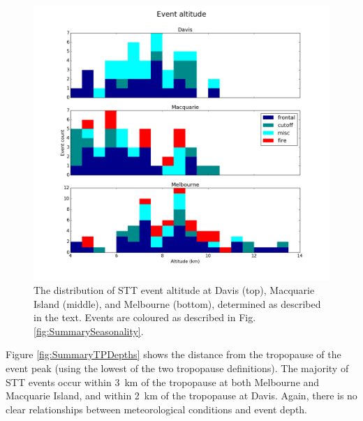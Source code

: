 \documentclass{article}
\begin{document}
  \begin{figure}[!htbp]
    \begin{center}
    \includegraphics[width=0.99\columnwidth]{figures/summary_altitude.png}
    \caption{The distribution of STT event altitude at Davis (top), Macquarie Island (middle), and Melbourne (bottom), determined as described in the text.
    Events are coloured as described in Fig. \ref{fig:SummarySeasonality}.}
    \label{fig:SummaryAltitudes}
    \end{center}
  \end{figure}

  Figure \ref{fig:SummaryTPDepths} shows the distance from the tropopause of the event peak (using the lowest of the two tropopause definitions).
  The majority of STT events occur within 3~km of the tropopause at both Melbourne and Macquarie Island, and within 2~km of the tropopause at Davis. 
  Again, there is no clear relationships between meteorological conditions and event depth.
\end{document}
